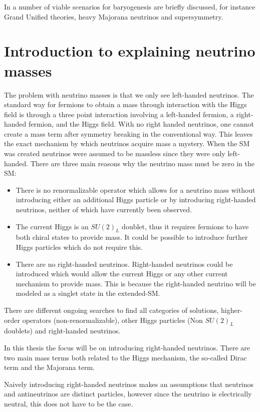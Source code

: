 In \cite{47Soler} a number of viable scenarios for baryogenesis are briefly discussed, for instance Grand Unified theories, heavy Majorana neutrinos and supersymmetry.

\section{Introduction to explaining neutrino masses}
The problem with neutrino masses is that we only see left-handed neutrinos. The standard way for fermions to obtain a mass through interaction with the Higgs field is through a three point interaction involving a left-handed fermion, a right-handed fermion, and the Higgs field. With no right handed neutrinos, one cannot create a mass term after symmetry breaking in the conventional way. This leaves the exact mechanism by which neutrinos acquire mass a mystery. When the SM was created neutrinos were assumed to be massless since they were only left-handed. There are three main reasons why the neutrino mass must be zero in the SM:
\begin{itemize}
\item There is no renormalizable operator which allows for a neutrino mass without introducing either an additional Higgs particle or by introducing right-handed neutrinos, neither of which have currently been observed.

\item The current Higgs is an $SU(2)_L$ doublet, thus it requires fermions to have both chiral states to provide mass. It could be possible to introduce further Higgs particles which do not require this.

\item There are no right-handed neutrinos. Right-handed neutrinos could be introduced which would allow the current Higgs or any other current mechanism to provide mass. This is because the right-handed neutrino will be modeled as a singlet state in the extended-SM.
\end{itemize}

There are different ongoing searches to find all categories of solutions, higher-order operators (non-renormalizable), other Higgs particles (Non $SU(2)_L $ doublets) and right-handed neutrinos.

In this thesis the focus will be on introducing right-handed neutrinos. There are two main mass terms both related to the Higgs mechanism, the so-called Dirac term and the Majorana term.

Naively introducing right-handed neutrinos makes an assumptions that neutrinos and antineutrinos are distinct particles, however since the neutrino is electrically neutral, this does not have to be the case.
 
